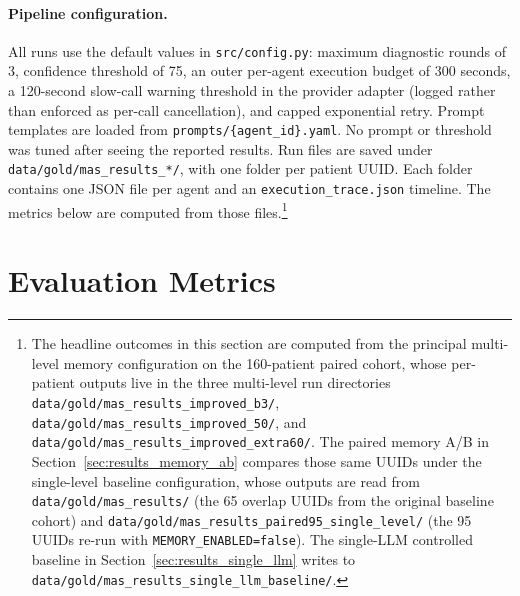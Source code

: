 \paragraph{Pipeline configuration.}
All runs use the default values in \texttt{src/config.py}: maximum diagnostic
rounds of 3, confidence threshold of 75, an outer per-agent execution budget
of 300 seconds, a 120-second slow-call warning threshold in the provider
adapter (logged rather than enforced as per-call cancellation), and capped
exponential retry. Prompt templates are loaded from
\texttt{prompts/\{agent\_id\}.yaml}. No prompt or threshold was tuned after
seeing the reported results. Run files are saved under
\texttt{data/gold/mas\_results\_*/}, with one folder per patient UUID. Each
folder contains one JSON file per agent and an \texttt{execution\_trace.json}
timeline. The metrics below are computed from those files.\footnote{The
headline outcomes in this section are computed from the principal
multi-level memory configuration on the 160-patient paired cohort,
whose per-patient outputs live in the three multi-level run directories
\texttt{data/gold/mas\_results\_improved\_b3/},
\texttt{data/gold/mas\_results\_improved\_50/}, and
\texttt{data/gold/mas\_results\_improved\_extra60/}. The paired memory
A/B in Section~\ref{sec:results_memory_ab} compares those same UUIDs
under the single-level baseline configuration, whose outputs are read
from \texttt{data/gold/mas\_results/} (the 65 overlap UUIDs from the
original baseline cohort) and
\texttt{data/gold/mas\_results\_paired95\_single\_level/} (the 95 UUIDs
re-run with \texttt{MEMORY\_ENABLED=false}). The single-LLM controlled
baseline in Section~\ref{sec:results_single_llm} writes to
\texttt{data/gold/mas\_results\_single\_llm\_baseline/}.}

\section{Evaluation Metrics}
\label{sec:results_metrics}

